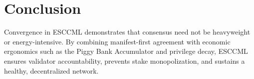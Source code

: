 \documentclass[11pt, a4paper]{article}
\begin{document}
\section{Conclusion}
Convergence in ESCCML demonstrates that consensus need not be heavyweight or energy-intensive.
By combining manifest-first agreement with economic ergonomics such as the Piggy Bank Accumulator
and privilege decay, ESCCML ensures validator accountability, prevents stake monopolization,
and sustains a healthy, decentralized network.
\end{document}
